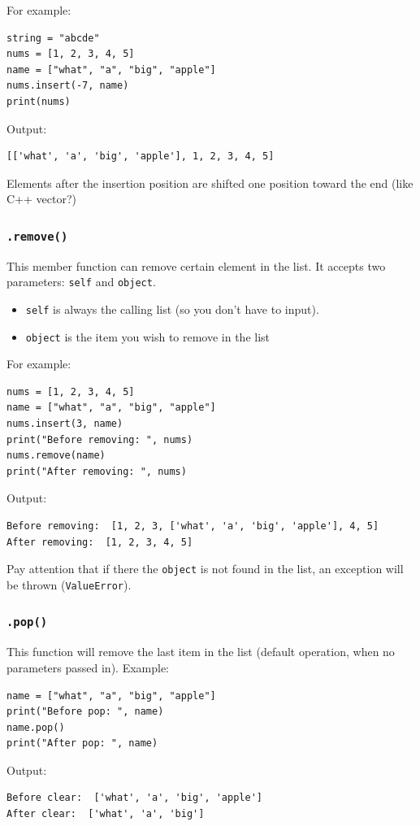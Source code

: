 \documentclass[12pt]{book}
\begin{document}
For example:
\begin{verbatim}
string = "abcde"
nums = [1, 2, 3, 4, 5]
name = ["what", "a", "big", "apple"]
nums.insert(-7, name)
print(nums)
\end{verbatim}
Output:
\begin{verbatim}
[['what', 'a', 'big', 'apple'], 1, 2, 3, 4, 5]
\end{verbatim}

Elements after the insertion position are shifted one position toward the end (like C++ vector?)
\subsubsection{\texttt{.remove()}}
\label{sec:orgba94840}
This member function can remove certain element in the list. It accepts two parameters: \texttt{self} and \texttt{object}.
\begin{itemize}
\item \texttt{self} is always the calling list (so you don't have to input).
\item \texttt{object} is the item you wish to remove in the list
\end{itemize}

For example:
\begin{verbatim}
nums = [1, 2, 3, 4, 5]
name = ["what", "a", "big", "apple"]
nums.insert(3, name)
print("Before removing: ", nums)
nums.remove(name)
print("After removing: ", nums)
\end{verbatim}
Output:
\begin{verbatim}
Before removing:  [1, 2, 3, ['what', 'a', 'big', 'apple'], 4, 5]
After removing:  [1, 2, 3, 4, 5]
\end{verbatim}

Pay attention that if there the \texttt{object} is not found in the list, an exception will be thrown (\texttt{ValueError}).
\subsubsection{\texttt{.pop()}}
\label{sec:orgf041e92}
This function will remove the last item in the list (default operation, when no parameters passed in). Example:
\begin{verbatim}
name = ["what", "a", "big", "apple"]
print("Before pop: ", name)
name.pop()
print("After pop: ", name)
\end{verbatim}
Output:
\begin{verbatim}
Before clear:  ['what', 'a', 'big', 'apple']
After clear:  ['what', 'a', 'big']
\end{verbatim}
\end{document}
